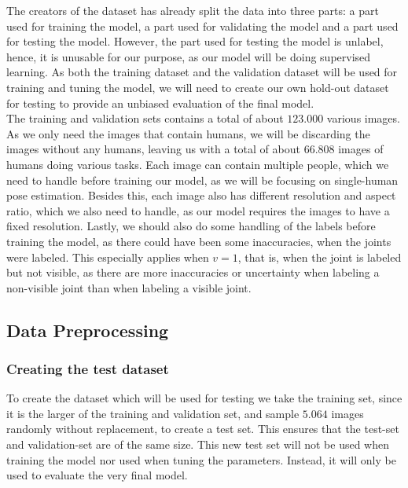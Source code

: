 \documentclass[main.tex]{subfiles}
\begin{document}
The creators of the dataset has already split the data into three parts: a part used for training the model, a part used for validating the model and a part used for testing the model. However, the part used for testing the model is unlabel, hence, it is unusable for our purpose, as our model will be doing supervised learning. As both the training dataset and the validation dataset will be used for training and tuning the model, we will need to create our own hold-out dataset for testing to provide an unbiased evaluation of the final model. \\
The training and validation sets contains a total of about $123.000$ various images. As we only need the images that contain humans, we will be discarding the images without any humans, leaving us with a total of about $66.808$ images of humans doing various tasks. Each image can contain multiple people, which we need to handle before training our model, as we will be focusing on single-human pose estimation. Besides this, each image also has different resolution and aspect ratio, which we also need to handle, as our model requires the images to have a fixed resolution. Lastly, we should also do some handling of the labels before training the model, as there could have been some inaccuracies, when the joints were labeled. This especially applies when $v = 1$, that is, when the joint is labeled but not visible, as there are more inaccuracies or uncertainty when labeling a non-visible joint than when labeling a visible joint.

\subsection{Data Preprocessing}
\subsubsection{Creating the test dataset}
To create the dataset which will be used for testing we take the training set, since it is the larger of the training and validation set, and sample $5.064$ images randomly without replacement, to create a test set. This ensures that the test-set and validation-set are of the same size. This new test set will not be used when training the model nor used when tuning the parameters. Instead, it will only be used to evaluate the very final model. 
\end{document}
